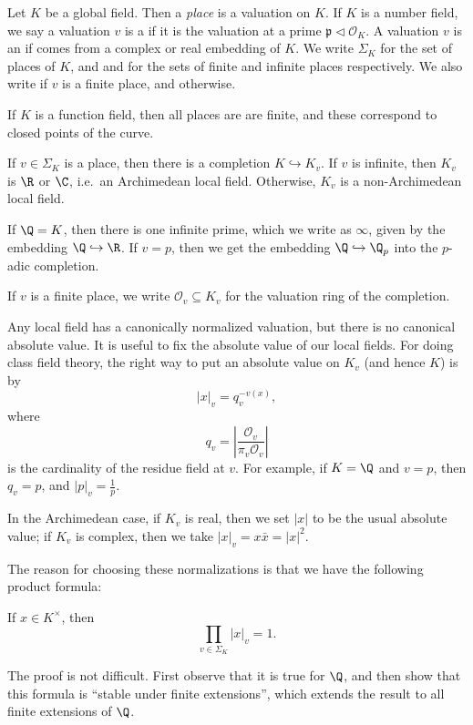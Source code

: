 \documentclass[a4paper]{article}
\begin{document}
\begin{defi}[Place]
  Let $K$ be a global field. Then a \emph{place} is a valuation on $K$. If $K$ is a number field, we say a valuation $v$ is a  if it is the valuation at a prime $\mathfrak{p} \lhd \mathcal{O}_K$. A valuation $v$ is an  if comes from a complex or real embedding of $K$. We write $\Sigma_K$ for the set of places of $K$, and  and  for the sets of finite and infinite places respectively. We also write  if $v$ is a finite place, and  otherwise.

  If $K$ is a function field, then all places are are finite, and these correspond to closed points of the curve.
\end{defi}

If $v \in \Sigma_K$ is a place, then there is a completion $K \hookrightarrow K_v$. If $v$ is infinite, then $K_v$ is $\R$ or $\C$, i.e.\ an Archimedean local field. Otherwise, $K_v$ is a non-Archimedean local field.

\begin{eg}
  If $\Q = K$, then there is one infinite prime, which we write as $\infty$, given by the embedding $\Q \hookrightarrow \R$. If $v = p$, then we get the embedding $\Q \hookrightarrow \Q_p$ into the $p$-adic completion.
\end{eg}

\begin{notation}
  If $v$ is a finite place, we write $\mathcal{O}_v \subseteq K_v$ for the valuation ring of the completion.
\end{notation}

Any local field has a canonically normalized valuation, but there is no canonical absolute value. It is useful to fix the absolute value of our local fields. For doing class field theory, the right way to put an absolute value on $K_v$ (and hence $K$) is by
\[
  |x|_v = q_v^{-v(x)},
\]
where
\[
  q_v = \left|\frac{\mathcal{O}_v}{\pi_v \mathcal{O}_v}\right|
\]
is the cardinality of the residue field at $v$. For example, if $K = \Q$ and $v = p$, then $q_v = p$, and $|p|_v = \frac{1}{p}$.

In the Archimedean case, if $K_v$ is real, then we set $|x|$ to be the usual absolute value; if $K_v$ is complex, then we take $|x|_v = x\bar{x} = |x|^2$.

The reason for choosing these normalizations is that we have the following product formula:
\begin{prop}
  If $x \in K^\times$, then
  \[
    \prod_{v \in \Sigma_K} |x|_v = 1.
  \]
\end{prop}
The proof is not difficult. First observe that it is true for $\Q$, and then show that this formula is ``stable under finite extensions'', which extends the result to all finite extensions of $\Q$.
\end{document}
